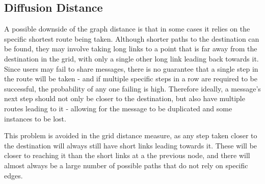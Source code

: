 \documentclass[bsc,frontabs,twoside,singlespacing,parskip,deptreport]{infthesis}     %
\begin{document}
\subsection{Diffusion Distance} \label{subsec:diffusion_dist}

A possible downside of the graph distance is that in some cases it relies on the specific shortest route being taken. Although shorter paths to the destination can be found, they may involve taking long links to a point that is far away from the destination in the grid, with only a single other long link leading back towards it. Since users may fail to share messages, there is no guarantee that a single step in the route will be taken - and if multiple specific steps in a row are required to be successful, the probability of any one failing is high. Therefore ideally, a message's next step should not only be closer to the destination, but also have multiple routes leading to it - allowing for the message to be duplicated and some instances to be lost.

This problem is avoided in the grid distance measure, as any step taken closer to the destination will always still have short links leading towards it. These will be closer to reaching it than the short links at a the previous node, and there will almost always be a large number of possible paths that do not rely on specific edges.
\end{document}
